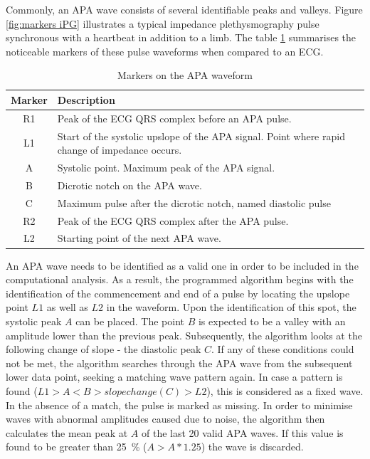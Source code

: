 Commonly, an APA wave consists of several identifiable peaks and valleys. Figure \ref{fig:markers iPG} illustrates a typical impedance plethysmography pulse synchronous with a heartbeat in addition to a limb. The table \ref{tbl:APA markers} summarises the noticeable markers of these pulse waveforms when compared to an ECG.

\begin{table}[!htpb]
	\caption{Markers on the APA waveform}
	\label{tbl:APA markers}
	\centering
	\begin{tabular}{c p{10cm}}
		\textbf{Marker} & \textbf{Description} \\
		\toprule
		R1 & Peak of the ECG QRS complex before an APA pulse. \\
		L1 & Start of the systolic upslope of the APA signal. Point where  rapid change of impedance occurs. \\
		A & Systolic point. Maximum peak of the APA signal.  \\
		B & Dicrotic notch on the APA wave. \\
		C & Maximum pulse after the dicrotic notch, named diastolic pulse  \\
		R2 & Peak of the ECG QRS complex after the APA pulse.  \\
		L2 & Starting point of the next APA wave. \\
		\bottomrule
	\end{tabular}
\end{table}

An APA wave needs to be identified as a valid one in order to be included in the computational analysis. As a result, the programmed algorithm begins with the identification of the commencement and end of a pulse by locating the upslope point $L1$ as well as $L2$ in the waveform. Upon the identification of this spot, the systolic peak $A$ can be placed. The point $B$ is expected to be a valley with an amplitude lower than the previous peak. Subsequently, the algorithm looks at the following change of slope - the diastolic peak $C$. If any of these conditions could not be met, the algorithm searches through the APA wave from the subsequent lower data point, seeking a matching wave pattern again. In case a pattern is found ($L1 > A < B > slope change (C) > L2$), this is considered as a fixed wave. In the absence of a match, the pulse is marked as missing. In order to minimise waves with abnormal amplitudes caused due to noise, the algorithm then calculates the mean peak at $A$ of the last 20 valid APA waves. If this value is found to be greater than \SI{25}{\percent} ($A > A*1.25$) the wave is discarded.


